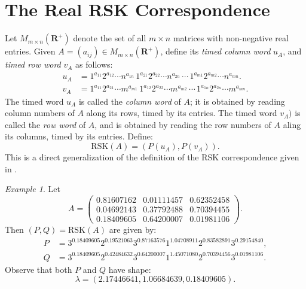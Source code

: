 \documentclass[10pt]{amsproc}
\theoremstyle{definition}
\theoremstyle{remark}
\newtheorem{example}[theorem]{Example}
\newcommand{\rp}{\mathbf{R}^+}
\newcommand{\rsk}{\mathrm{RSK}}
\begin{document}
\section{The Real RSK Correspondence}
\label{sec:rsk}

Let $M_{m\times n}(\rp)$ denote the set of all $m\times n$ matrices with non-negative real entries.
Given $A=(a_{ij})\in M_{m\times n}(\rp)$, define its \emph{timed column word} $u_A$, and \emph{timed row word} $v_A$ as follows:
\begin{align*}
  u_A & = 1^{a_{11}}2^{a_{12}}\dotsb n^{a_{1n}}\,1^{a_{21}}2^{a_{22}}\dotsb n^{a_{2n}}\,\dotsb \,1^{a_{m1}}2^{a_{m2}}\dotsb n^{a_{mn}}.\\
  v_A & = 1^{a_{11}}2^{a_{21}}\dotsb m^{a_{m1}}\,1^{a_{12}}2^{a_{22}}\dotsb m^{a_{m2}}\,\dotsb \,1^{a_{1n}}2^{a_{2n}}\dotsb m^{a_{mn}}.
\end{align*}
The timed word $u_A$ is called the \emph{column word} of $A$; it is obtained by reading column numbers of $A$ along its rows, timed by its entries.
The timed word $v_A)$ is called the \emph{row word} of $A$, and is obtained by reading the row numbers of $A$ aling its columns, timed by its entries.
Define:
\begin{equation}
  \label{eq:rsk}
  \rsk(A) = (P(u_A), P(v_A)).
\end{equation}
This is a direct generalization of the definition of the RSK correspondence given in \cite[Section~18]{schur_poly}.
\begin{example}
  Let
  \begin{displaymath}
    A = 
    \begin{pmatrix}
      0.81607162 & 0.01111457 & 0.62352458 \\
      0.04692143 & 0.37792488 & 0.70394455 \\
      0.18409605 & 0.64200007 & 0.01981106
    \end{pmatrix}.
  \end{displaymath}
  Then $(P, Q) = \rsk(A)$ are given by:
  \begin{align*}
    P & = 3^{0.18409605}2^{0.19521063}3^{0.87163576}1^{1.04708911}2^{0.83582891}3^{0.29154840},\\
    Q & = 3^{0.18409605}2^{0.42484632}3^{0.64200007}1^{1.45071080}2^{0.70394456}3^{0.01981106}.
  \end{align*}
  Observe that both $P$ and $Q$ have shape:
  \begin{displaymath}
    \lambda = (2.17446641, 1.06684639, 0.18409605).
  \end{displaymath}
\end{example}
\end{document}
